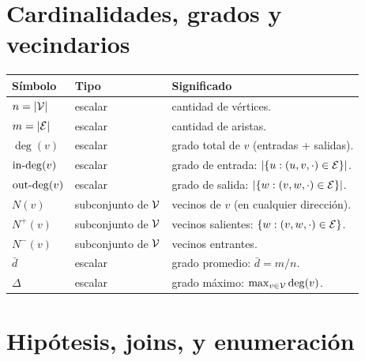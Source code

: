 \section{Cardinalidades, grados y vecindarios}

\begin{center}
\renewcommand{\arraystretch}{1.3}
\begin{longtable}{p{3.0cm}p{2.5cm}p{8.0cm}}
\toprule
\textbf{Símbolo} & \textbf{Tipo} & \textbf{Significado} \\
\midrule
\(n = |\mathcal{V}|\)                  & escalar          & cantidad de vértices. \\
\(m = |\mathcal{E}|\)                  & escalar          & cantidad de aristas. \\
\(\deg(v)\)                   & escalar          & grado total de \(v\) (entradas + salidas). \\
\(\mathrm{in\text{-}deg}(v)\)                 & escalar          & grado de entrada: \(|\{u : (u, v, \cdot) \in \mathcal{E}\}|\). \\
\(\mathrm{out\text{-}deg}(v)\)                & escalar          & grado de salida: \(|\{w : (v, w, \cdot) \in \mathcal{E}\}|\). \\
\(N(v)\)                      & subconjunto de \(\mathcal{V}\) & vecinos de \(v\) (en cualquier dirección). \\
\(N^{+}(v)\)                  & subconjunto de \(\mathcal{V}\) & vecinos salientes: \(\{w : (v, w, \cdot) \in \mathcal{E}\}\). \\
\(N^{-}(v)\)                  & subconjunto de \(\mathcal{V}\) & vecinos entrantes. \\
\(\bar{d}\)                   & escalar          & grado promedio: \(\bar{d} = m / n\). \\
\(\Delta\)                    & escalar          & grado máximo: \(\max_{v \in \mathcal{V}} \deg(v)\). \\
\bottomrule
\end{longtable}
\end{center}

\section{Hipótesis, joins, y enumeración}

